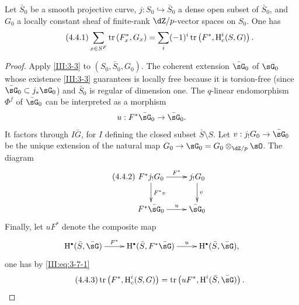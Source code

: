 \begin{theorem_}\label{III:4-1bis}
Let $\bar S_0$ be a smooth projective curve,
$j:S_0\hookrightarrow \bar S_0$ a dense open subset of $\bar S_0$, and $G_0$ a
locally constant sheaf of finite-rank $\dZ/p$-vector spaces on
$S_0$. One has
\begin{equation*}\tag{4.4.1}\label{III:eq:4-4-1}
  \sum_{x\in S^F} \operatorname{tr}\left(F_x^*,G_x\right) = \sum_i (-1)^i \operatorname{tr}\left(F^*,\operatorname{H}_c^i(S,G)\right) \text{.}
\end{equation*}
\end{theorem_}
\begin{proof}
Apply \ref{III:3-3} to $(S_0,\bar S_0,G_0)$. The coherent extension
$\bar\sG_0$ of $\sG_0$ whose existence \ref{III:3-3} guarantees is locally
free because it is torsion-free (since $\bar\sG_0\subset j_*\sG_0$) and
$\bar S_0$ is regular of dimension one. The $q$-linear endomorphism
$\Phi^f$ of $\bar\sG_0$ can be interpreted as a morphism
\[
  u : F^*\bar\sG_0 \to \bar\sG_0 \text{.}
\]
It factors through $I\bar G$, for $I$ defining the closed subset
$\bar S\setminus S$. Let $v:j_!G_0 \to \bar\sG_0$ be the unique extension of
the natural map $G_0 \to \sG_0 = G_0\otimes_{\dZ/p}\sO$. The diagram
\begin{equation*}\tag{4.4.2}\label{III:eq:4-4-2}
\xymatrix{
  F^* j_! G_0 \ar[r]^-{F^*} \ar[d]^-{F^* v}
    & j_! G_0 \ar[d]^-v \\
  F^*\bar \sG_0 \ar[r]^-u
    & \bar\sG_0
}
\end{equation*}
Finally, let $u F^*$ denote the composite map
\[\xymatrix{
  \h^\bullet(\bar S,\bar\sG) \ar[r]^-{F^*}
    & \h^\bullet(\bar S,F^*\bar\sG) \ar[r]^-u
    & \h^\bullet(\bar S,\bar\sG) \text{,}
}\]
one has by \eqref{III:eq:3-7-1}
\begin{equation*}\tag{4.4.3}\label{III:eq:4-4-3}
  \tr\left(F^*,\h_c^i(S,G)\right) = \tr\left(u F^*,\h^i(\bar S,\bar\sG)\right) \text{.}
\end{equation*}


\end{proof}
